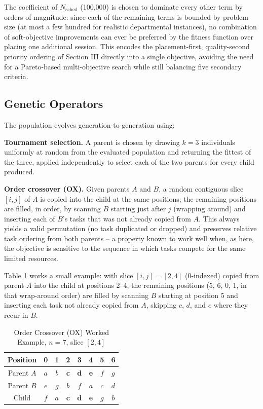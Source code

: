 \documentclass[conference]{IEEEtran}
\begin{document}
The coefficient of $N_{\text{sched}}$ (100{,}000) is chosen to dominate every other term by orders of magnitude: since each of the remaining terms is bounded by problem size (at most a few hundred for realistic departmental instances), no combination of soft-objective improvements can ever be preferred by the fitness function over placing one additional session. This encodes the placement-first, quality-second priority ordering of Section III directly into a single objective, avoiding the need for a Pareto-based multi-objective search while still balancing five secondary criteria.

\subsection{Genetic Operators}
The population evolves generation-to-generation using:

\textbf{Tournament selection.} A parent is chosen by drawing $k{=}3$ individuals uniformly at random from the evaluated population and returning the fittest of the three, applied independently to select each of the two parents for every child produced.

\textbf{Order crossover (OX).} Given parents $A$ and $B$, a random contiguous slice $[i,j]$ of $A$ is copied into the child at the same positions; the remaining positions are filled, in order, by scanning $B$ starting just after $j$ (wrapping around) and inserting each of $B$'s tasks that was not already copied from $A$. This always yields a valid permutation (no task duplicated or dropped) and preserves relative task ordering from both parents -- a property known to work well when, as here, the objective is sensitive to the sequence in which tasks compete for the same limited resources.

Table \ref{tab:ox} works a small example: with slice $[i,j]{=}[2,4]$ (0-indexed) copied from parent $A$ into the child at positions 2--4, the remaining positions (5, 6, 0, 1, in that wrap-around order) are filled by scanning $B$ starting at position 5 and inserting each task not already copied from $A$, skipping $c$, $d$, and $e$ where they recur in $B$.

\begin{table}[t]
\caption{Order Crossover (OX) Worked Example, $n{=}7$, slice $[2,4]$}
\label{tab:ox}
\centering
\small
\begin{tabular}{cccccccc}
\toprule
Position & 0 & 1 & 2 & 3 & 4 & 5 & 6 \\
\midrule
Parent $A$ & $a$ & $b$ & \bfseries c & \bfseries d & \bfseries e & $f$ & $g$ \\
Parent $B$ & $e$ & $g$ & $b$ & $f$ & $a$ & $c$ & $d$ \\
\midrule
Child & $f$ & $a$ & \bfseries c & \bfseries d & \bfseries e & $g$ & $b$ \\
\bottomrule
\end{tabular}
\end{table}
\end{document}
